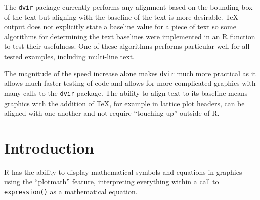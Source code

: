 \documentclass[]{article}
\newenvironment{Shaded}{\begin{snugshade}}{\end{snugshade}}
\newcommand{\KeywordTok}[1]{\textcolor[rgb]{0.13,0.29,0.53}{\textbf{#1}}}
\newcommand{\DataTypeTok}[1]{\textcolor[rgb]{0.13,0.29,0.53}{#1}}
\newcommand{\DecValTok}[1]{\textcolor[rgb]{0.00,0.00,0.81}{#1}}
\newcommand{\StringTok}[1]{\textcolor[rgb]{0.31,0.60,0.02}{#1}}
\newcommand{\OperatorTok}[1]{\textcolor[rgb]{0.81,0.36,0.00}{\textbf{#1}}}
\newcommand{\NormalTok}[1]{#1}
\begin{document}
The \texttt{dvir} package currently performs any alignment based on the
bounding box of the text but aligning with the baseline of the text is
more desirable. \TeX{} output does not explicitly state a baseline value
for a piece of text so some algorithms for determining the text
baselines were implemented in an R function to test their usefulness.
One of these algorithms performs particular well for all tested
examples, including multi-line text.

The magnitude of the speed increase alone makes \texttt{dvir} much more
practical as it allows much faster testing of code and allows for more
complicated graphics with many calls to the \texttt{dvir} package. The
ability to align text to its baseline means graphics with the addition
of \TeX{}, for example in lattice plot headers, can be aligned with one
another and not require ``touching up'' outside of R.

\newpage{}

\section{Introduction}\label{introduction}

R has the ability to display mathematical symbols and equations in
graphics using the ``plotmath'' feature, interpreting everything within
a call to \texttt{expression()} as a mathematical equation.

\begin{Shaded}
\end{Shaded}
\end{document}
